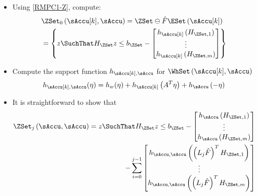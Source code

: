 \begin{itemize}
\item Using \eqref{RMPC1-Z}, compute:
\begin{equation}
\begin{split}
&\ZSet_{0}\left(\sAccu[k],\sAccu\right)=\ZSet\ominus\hat{F}\ESet\left(\sAccu[k]\right) \\
&=\left\{ z\SuchThat H_{\ZSet}z\leq b_{\ZSet}-\begin{bmatrix}h_{\sAccu[k]}\left(H_{\ZSet,1}\right)\\
\vdots\\
h_{\sAccu[k]}\left(H_{\ZSet,m}\right)
\end{bmatrix}\right\} 
\end{split}
\end{equation}

\item Compute the support function $h_{\sAccu[k],\sAccu}$ for $\WhSet\left(\sAccu[k],\sAccu\right)$
\begin{equation}
h_{\sAccu[k],\sAccu}(\eta)=h_{w}(\eta)+h_{\sAccu[k]}\left(A^{T}\eta\right)+h_{\sAccu}\left(-\eta\right)
\end{equation}

\item It is straightforward to show that
\begin{equation}
\begin{split}
\ZSet_{j}\left(\sAccu,\sAccu\right)= z\SuchThat H_{\ZSet}z\leq b_{\ZSet}-\begin{bmatrix}h_{\sAccu}\left(H_{\ZSet,1}\right)\\
\vdots\\
h_{\sAccu}\left(H_{\ZSet,m}\right)
\end{bmatrix} \\
-\sum_{i=0}^{j-1}\begin{bmatrix}h_{\sAccu,\sAccu}\left(\left(L_{j}\hat{F}\right)^{T}H_{\ZSet,1}\right)\\
\vdots\\
h_{\sAccu,\sAccu}\left(\left(L_{j}\hat{F}\right)^{T}H_{\ZSet,m}\right)
\end{bmatrix}
\end{split}
\end{equation}


\end{itemize}
